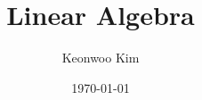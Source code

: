 \documentclass{book}
\title{Linear Algebra}
\author{Keonwoo Kim}
\date{\today}
\theoremstyle{definition}
\begin{document}
\tableofcontents{}






 
\end{document}
